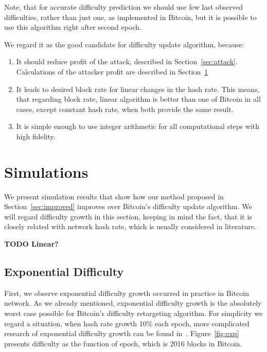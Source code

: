 \documentclass[]{llncs}
\begin{document}
Note, that for accurate difficulty prediction we should use few last observed difficulties, rather than just one, as implemented in Bitcoin, but it is possible to use this algorithm right after second epoch.


We regard it as the good candidate for difficulty update algorithm, because:
\begin{enumerate}
\item{It should reduce profit of the attack, described in Section~\ref{sec:attack}. Calculations of the attacker profit are described in Section~\ref{sec:sim}}
\item{It leads to desired block rate for linear changes in the hash rate.
This means, that regarding block rate, linear algorithm is better than one of Bitcoin in all cases, except constant hash rate, when both provide the same result. }
\item{It is simple enough to use integer arithmetic for all computational steps with high fidelity.}
\end{enumerate}

\section{Simulations}
\label{sec:sim}

We present simulation results that show how our method proposed in Section~\ref{sec:improved} improves over Bitcoin’s difficulty update algorithm.
We will regard difficulty growth in this section, keeping in mind the fact, that it is closely related with network hash rate, which is usually considered in literature.

\textbf{TODO Linear?}

\subsection{Exponential Difficulty}

First, we observe exponential difficulty growth occurred in practice in Bitcoin network. As we already mentioned, exponential difficulty growth is the absolutely worst case possible for Bitcoin’s difficulty retargeting algorithm.
For simplicity we regard a situation, when hash rate growth 10\% each epoch, more complicated research of exponential difficulty growth can be found in~\cite{kraft2015difficulty}.
Figure~\ref{fig:exp} presents difficulty as the function of epoch, which is 2016 blocks in Bitcoin.
\end{document}
